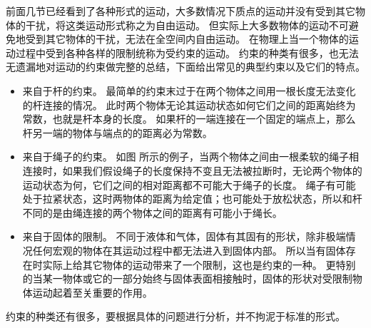 前面几节已经看到了各种形式的运动，大多数情况下质点的运动并没有受到其它物体的干扰，将这类运动形式称之为{\heiti 自由运动}。
但实际上大多数物体的运动不可避免地受到其它物体的干扰，无法在全空间内自由运动。
在物理上当一个物体的运动过程中受到各种各样的限制统称为受{\heiti 约束}的运动。
约束的种类有很多，也无法无遗漏地对运动的约束做完整的总结，下面给出常见的典型约束以及它们的特点。
\begin{itemize}
\item 来自于杆的约束。
最简单的约束末过于在两个物体之间用一根长度无法变化的杆连接的情况。
此时两个物体无论其运动状态如何它们之间的距离始终为常数，也就是杆本身的长度。
如果杆的一端连接在一个固定的端点上，那么杆另一端的物体与端点的的距离必为常数。
\item 来自于绳子的约束。
如图 所示的例子，当两个物体之间由一根柔软的绳子相连接时，如果我们假设绳子的长度保持不变且无法被拉断时，无论两个物体的运动状态为何，它们之间的相对距离都不可能大于绳子的长度。
绳子有可能处于拉紧状态，这时两物体的距离为给定值；也可能处于放松状态，所以和杆不同的是由绳连接的两个物体之间的距离有可能小于绳长。
\item 来自于固体的限制。
不同于液体和气体，固体有其固有的形状，除非极端情况任何宏观的物体在其运动过程中都无法进入到固体内部。
所以当有固体存在时实际上给其它物体的运动带来了一个限制，这也是约束的一种。
更特别的当某一物体或它的一部分始终与固体表面相接触时，固体的形状对受限制物体运动起着至关重要的作用。
\end{itemize}
约束的种类还有很多，要根据具体的问题进行分析，并不拘泥于标准的形式。

